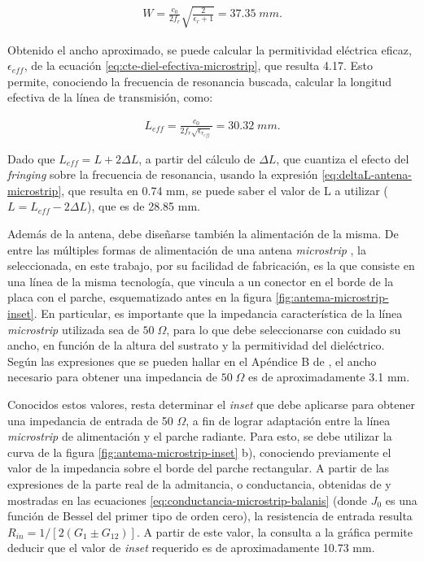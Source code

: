 \begin{align}
	W = \frac{c_0}{2 f_r} \sqrt{\frac{2}{\epsilon_r+1}} = 37.35\; mm.
\end{align}

Obtenido el ancho aproximado, se puede calcular la permitividad eléctrica eficaz, $\epsilon_{eff}$, de la ecuación \ref{eq:cte-diel-efectiva-microstrip}, que resulta 4.17. Esto permite, conociendo la frecuencia de resonancia buscada, calcular la longitud efectiva de la línea de transmisión, como:

\begin{align}
	L_{eff} = \frac{c_0}{2 f_r \sqrt{\epsilon_{r_{eff}}}} = 30.32\; mm.
\end{align}

Dado que $L_{eff} = L + 2 \Delta L$, a partir del cálculo de $\Delta L$, que cuantiza el efecto del \textit{fringing} sobre la frecuencia de resonancia, usando la expresión \ref{eq:deltaL-antena-microstrip}, que resulta en 0.74 mm, se puede saber el valor de L a utilizar ($L = L_{eff} - 2 \Delta L$), que es de 28.85 mm.

Además de la antena, debe diseñarse también la alimentación de la misma. De entre las múltiples formas de alimentación de una antena \textit{microstrip} \cite{Barthia:Handbook}, la seleccionada, en este trabajo, por su facilidad de fabricación, es la que consiste en una línea de la misma tecnología, que vincula a un conector en el borde de la placa con el parche, esquematizado antes en la figura \ref{fig:antema-microstrip-inset}. En particular, es importante que la impedancia característica de la línea \textit{microstrip} utilizada sea de $50\;\Omega$, para lo que debe seleccionarse con cuidado su ancho, en función de la altura del sustrato y la permitividad del dieléctrico. Según las expresiones que se pueden hallar en el Apéndice B de \cite{Barthia:Handbook}, el ancho necesario para obtener una impedancia de $50\;\Omega$ es de aproximadamente 3.1 mm.

Conocidos estos valores, resta determinar el \textit{inset} que debe aplicarse para obtener una impedancia de entrada de 50 $\Omega$, a fin de lograr adaptación entre la línea \textit{microstrip} de alimentación y el parche radiante. Para esto, se debe utilizar la curva de la figura \ref{fig:antema-microstrip-inset} b), conociendo previamente el valor de la impedancia sobre el borde del parche rectangular. A partir de las expresiones de la parte real de la admitancia, o conductancia, obtenidas de \cite{Balanis:Theory} y mostradas en las ecuaciones \ref{eq:conductancia-microstrip-balanis} (donde $J_0$ es una función de Bessel del primer tipo de orden cero), la resistencia de entrada resulta $R_{in} = 1/[2(G_1 \pm G_{12})]$. A partir de este valor, la consulta a la gráfica permite deducir que el valor de \textit{inset} requerido es de aproximadamente 10.73 mm.

